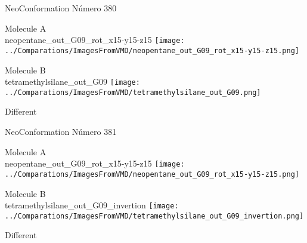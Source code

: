 \vtab[-2cm]
\begin{center}
{\large NeoConformation \tab Número 380}
\end{center}
\begin{multicols}{2}
\begin{center}
Molecule A \\ 
neopentane\_out\_G09\_rot\_x15-y15-z15
\texttt{[image: ../Comparations/ImagesFromVMD/neopentane\_out\_G09\_rot\_x15-y15-z15.png]}
\\
\vtab

\columnbreak
Molecule B \\ 
tetramethylsilane\_out\_G09
\texttt{[image: ../Comparations/ImagesFromVMD/tetramethylsilane\_out\_G09.png]}
\\
\vtab


\end{center}
\end{multicols}
\begin{center}
\vtab
\vtab
\textcolor{NavyBlue}{\Large Different}
\end{center}

 \newpage

\vtab[-2cm]
\begin{center}
{\large NeoConformation \tab Número 381}
\end{center}
\begin{multicols}{2}
\begin{center}
Molecule A \\ 
neopentane\_out\_G09\_rot\_x15-y15-z15
\texttt{[image: ../Comparations/ImagesFromVMD/neopentane\_out\_G09\_rot\_x15-y15-z15.png]}
\\
\vtab

\columnbreak
Molecule B \\ 
tetramethylsilane\_out\_G09\_invertion
\texttt{[image: ../Comparations/ImagesFromVMD/tetramethylsilane\_out\_G09\_invertion.png]}
\\
\vtab


\end{center}
\end{multicols}
\begin{center}
\vtab
\vtab
\textcolor{NavyBlue}{\Large Different}
\end{center}

 \newpage

